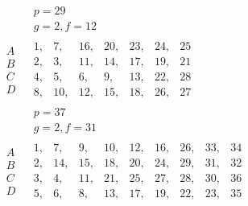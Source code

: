 \documentclass[twoside,12pt]{memoir}
\begin{document}
\[\begin{aligned}
& \begin{array}{c} p=29 \\  g=2, f=12 \end{array} \\
\begin{array}{l} A \\ B \\ C \\D \end{array} & 
\begin{array}{|rrrrrrr} 1,&7,&16,&20,&23,&24,&25\\ 
2,& 3,&11,&14,&17,&19,&21 \\ 
4,& 5,&6,&9,&13,&22,&28 \\ 
8,& 10,& 12,&15,&18,& 26,&27
\end{array} \\
& \begin{array}{c} p = 37 \\  g=2, f=31 \end{array} \\
\begin{array}{l} A \\ B \\ C \\D \end{array} &  
\begin{array}{|rrrrrrrrr} 
1,&7,&9,&10,&12,&16,&26,&33,&34 \\ 
2,& 14,&15,&18,&20,&24,&29,&31,&32 \\ 
3,& 4,& 11,&21,&25,&27,&28,&30,&36 \\ 
5,&6,&8,& 13,& 17,&19,&22,& 23,&35
\end{array} \\
\end{aligned}\]
%
\end{document}
